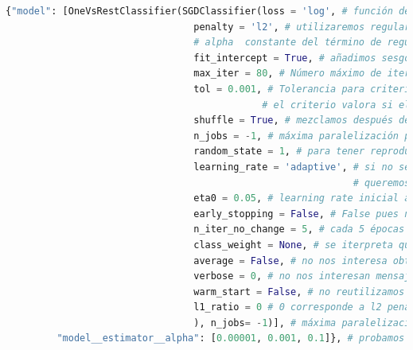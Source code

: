 \documentclass[11pt,a4paper]{article}
\theoremstyle{definition}
\begin{document}
	\begin{lstlisting}[language=Python, caption= Par\'ametros usados en SGDClassifier, inputencoding=latin1]
  {"model": [OneVsRestClassifier(SGDClassifier(loss = 'log', # función de pérdida de regresión logística
                                 penalty = 'l2', # utilizaremos regularización l2
                                 # alpha  constante del término de regularización (probaremos distintos valores mediante 5-fold cross validation)
                                 fit_intercept = True, # añadimos sesgo o intercept pues nuestra matriz aún no tiene columna de 1s 
                                 max_iter = 80, # Número máximo de iteraciones arbitrario
                                 tol = 0.001, # Tolerancia para criterio de parada por tolerancia (parar si loss > best_loss - tol tras n_iter_no_change épocas seguidas)
                                             # el criterio valora si el error es no mejora en 0.001 el mejor error hasta el momento. En nuestro caso esta condición por tolerancia se usará para learning_rate adaptativo
                                 shuffle = True, # mezclamos después de cada época
                                 n_jobs = -1, # máxima paralelización posible en ejecución
                                 random_state = 1, # para tener reproducibilidad de los resultados
                                 learning_rate = 'adaptive', # si no se mejora resultado por criterio tolerancia (loss > best_loss - tol) tras n_iter_no_change épocas seguidas, entonces cambiamos learning rate por (learning rate)/5
                                                             # queremos evitar oscilación
                                 eta0 = 0.05, # learning rate inicial arbitrario
                                 early_stopping = False, # False pues no queremos reservar más datos para validación
                                 n_iter_no_change = 5, # cada 5 épocas sin mejora en crit. tolerancia se realizará la adaptación del learning rate (learning_rate='adaptive')
                                 class_weight = None, # se iterpreta que todas las clases tienen peso 1, que es el caso
                                 average = False, # no nos interesa obtener media de pesos
                                 verbose = 0, # no nos interesan mensajes 
                                 warm_start = False, # no reutilizamos ninguna solución anterior durante la validación cruzada
                                 l1_ratio = 0 # 0 corresponde a l2 penalty, no se usará pues solo se usa si learning_rate = 'elasticnet'
                                 ), n_jobs= -1)], # máxima paralelización posible
         "model__estimator__alpha": [0.00001, 0.001, 0.1]}, # probamos valores de regularización arbitrarios dentro de los recomendados

	\end{lstlisting}
	
\end{document}
